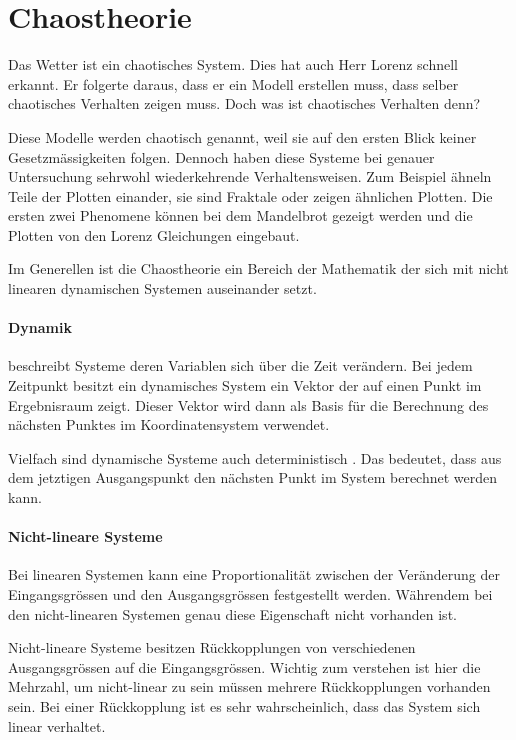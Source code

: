 \documentclass[chaostheorie/chaostheorie.tex]{subfiles}
\begin{document}
	\section{Chaostheorie}
	Das Wetter ist ein chaotisches System. Dies hat auch Herr Lorenz schnell erkannt. Er folgerte daraus, dass er ein Modell erstellen muss, dass selber chaotisches Verhalten zeigen muss. Doch was ist chaotisches Verhalten denn?
	
	Diese Modelle werden chaotisch genannt, weil sie auf den ersten Blick keiner Gesetzmässigkeiten folgen. Dennoch haben diese Systeme bei genauer Untersuchung sehrwohl wiederkehrende Verhaltensweisen. Zum Beispiel ähneln Teile der Plotten einander, sie sind Fraktale oder zeigen ähnlichen Plotten. Die ersten zwei Phenomene können bei dem Mandelbrot gezeigt werden \cite{Gleick} und die Plotten von den Lorenz Gleichungen eingebaut.
	
	Im Generellen ist die Chaostheorie ein Bereich der Mathematik der sich mit nicht linearen dynamischen Systemen auseinander setzt.
	
	\paragraph{Dynamik} beschreibt Systeme deren Variablen sich über die Zeit verändern. Bei jedem Zeitpunkt besitzt ein dynamisches System ein Vektor der auf einen Punkt im Ergebnisraum zeigt. Dieser Vektor wird dann als Basis für die Berechnung des nächsten Punktes im Koordinatensystem verwendet.
	
	Vielfach sind dynamische Systeme auch deterministisch \cite{https://en.wikipedia.org/wiki/Dynamical_system}. Das bedeutet, dass aus dem jetztigen Ausgangspunkt den nächsten Punkt im System berechnet werden kann.
	
	
	\paragraph{Nicht-lineare Systeme} %
	Bei linearen Systemen kann eine Proportionalität zwischen der Veränderung der Eingangsgrössen und den Ausgangsgrössen festgestellt werden. Währendem bei den nicht-linearen Systemen genau diese Eigenschaft nicht vorhanden ist.
	
	Nicht-lineare Systeme besitzen Rückkopplungen von verschiedenen Ausgangsgrössen auf die Eingangsgrössen. Wichtig zum verstehen ist hier die Mehrzahl, um nicht-linear zu sein müssen mehrere Rückkopplungen vorhanden sein. Bei einer Rückkopplung ist es sehr wahrscheinlich, dass das System sich linear verhaltet.
	
\end{document}
